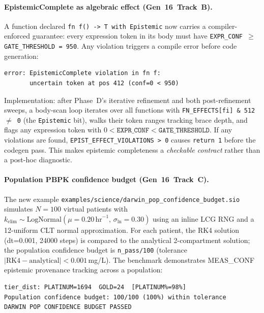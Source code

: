 \documentclass[acmsmall,screen,review,anonymous]{acmart}
\begin{document}
\paragraph{EpistemicComplete as algebraic effect (Gen~16~Track~B).}
A function declared \texttt{fn f() -> T with Epistemic} now carries a
compiler-enforced guarantee: every expression token in its body must have
\texttt{EXPR\_CONF $\geq$ GATE\_THRESHOLD = 950}.
Any violation triggers a compile error before code generation:
\begin{verbatim}
error: EpistemicComplete violation in fn f:
       uncertain token at pos 412 (conf=0 < 950)
\end{verbatim}
Implementation: after Phase~D's iterative refinement and both
post-refinement sweeps, a body-scan loop iterates over all functions
with \texttt{FN\_EFFECTS[fi] \& 512 $\neq$ 0} (the \texttt{Epistemic}
bit), walks their token ranges tracking brace depth, and flags any
expression token with $0 < \texttt{EXPR\_CONF} < \texttt{GATE\_THRESHOLD}$.
If any violations are found, \texttt{EPIST\_EFFECT\_VIOLATIONS > 0} causes
\texttt{return 1} before the codegen pass.
This makes epistemic completeness a \emph{checkable contract} rather than
a post-hoc diagnostic.

\paragraph{Population PBPK confidence budget (Gen~16~Track~C).}
The new example \texttt{examples/science/darwin\_pop\_confidence\_budget.sio}
simulates $N=100$ virtual patients with
$k_\text{elim} \sim \text{LogNormal}(\mu=0.20\,\text{hr}^{-1},\,\sigma_\ln=0.30)$
using an inline LCG RNG and a 12-uniform CLT normal approximation.
For each patient, the RK4 solution (dt=0.001, 24000 steps) is compared
to the analytical 2-compartment solution; the population confidence
budget is \texttt{n\_pass/100} (tolerance $|\text{RK4}-\text{analytical}|<0.001$\,mg/L).
The benchmark demonstrates MEAS\_CONF epistemic provenance tracking across
a population:
\begin{verbatim}
tier_dist: PLATINUM=1694  GOLD=24  [PLATINUM%=98%]
Population confidence budget: 100/100 (100%) within tolerance
DARWIN POP CONFIDENCE BUDGET PASSED
\end{verbatim}
\end{document}
